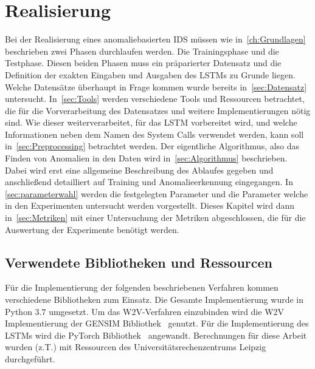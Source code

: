 \chapter{Realisierung}\label{ch:Realisierung}
    Bei der Realisierung eines anomaliebasierten \ac{IDS} müssen wie in~\autoref{ch:Grundlagen} beschrieben zwei Phasen durchlaufen werden.
    Die Trainingsphase und die Testphase.
    Diesen beiden Phasen muss ein präparierter Datensatz und die Definition der exakten Eingaben und Ausgaben des \acp{LSTM} zu Grunde liegen. 
    Welche Datensätze überhaupt in Frage kommen wurde bereits in~\autoref{sec:Datensatz} untersucht.
    In~\autoref{sec:Tools} werden verschiedene Tools und Ressourcen betrachtet, die für die Vorverarbeitung des Datensatzes und weitere Implementierungen nötig sind.
    Wie dieser weiterverarbeitet, für das \ac{LSTM} vorbereitet wird, und welche Informationen neben dem Namen des System Calls verwendet werden, kann soll in~\autoref{sec:Preprocessing} betrachtet werden.%
    Der eigentliche Algorithmus, also das Finden von Anomalien in den Daten wird in~\autoref{sec:Algorithmus} beschrieben.
    Dabei wird erst eine allgemeine Beschreibung des Ablaufes gegeben und anschließend detailliert auf Training und Anomalieerkennung eingegangen.
    In \autoref{sec:parameterwahl} werden die festgelegten Parameter und die Parameter welche in den Experimenten untersucht werden vorgestellt.
    Dieses Kapitel wird dann in~\autoref{sec:Metriken} mit einer Untersuchung der Metriken abgeschlossen, die für die Auswertung der Experimente benötigt werden. 

    \section{Verwendete Bibliotheken und Ressourcen}\label{sec:Tools}
        Für die Implementierung der folgenden beschriebenen Verfahren kommen verschiedene Bibliotheken zum Einsatz.
        Die Gesamte Implementierung wurde in Python $3.7$ umgesetzt.
        Um das \ac{W2V}-Verfahren einzubinden wird die \ac{W2V} Implementierung der GENSIM Bibliothek~\cite{GENSIM} genutzt.
        Für die Implementierung des \acp{LSTM} wird die PyTorch Bibliothek~\cite{PYTORCH} angewandt. 
        Berechnungen für diese Arbeit wurden (z.T.) mit Ressourcen des Universitätsrechenzentrums Leipzig durchgeführt.

